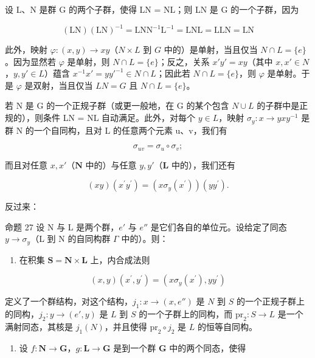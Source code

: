 设 L、N 是群 G 的两个子群，使得 LN = NL；则 LN 是 G 的一个子群，因为

\[
(\mathrm{LN}) (\mathrm{LN}) ^ {- 1} = \mathrm{LNN} ^ {- 1} \mathrm{L} ^ {- 1} = \mathrm{LNL} = \mathrm{LLN} = \mathrm{LN}
\]

此外，映射 \(\varphi: (x, y) \to xy\)（\(N \times L\) 到 \(G\) 中的）是单射，当且仅当 \(N \cap L = \{e\}\)。因为显然若 \(\varphi\) 是单射，则 \(N \cap L = \{e\}\)；反之，关系 \(x' y' = xy\)（其中 \(x, x' \in N\)，\(y, y' \in L\)）蕴含 \(x^{-1}x' = yy'^{-1} \in N \cap L\)；因此若 \(N \cap L = \{e\}\)，则 \(\varphi\) 是单射。于是 \(\varphi\) 是双射，当且仅当 \(LN = G\) 且 \(N \cap L = \{e\}\)。

若 N 是 G 的一个正规子群（或更一般地，在 G 的某个包含 \(N \cup L\) 的子群中是正规的），则条件 LN = NL 自动满足。此外，对每个 \(y \in L\)，映射 \(\sigma_{y}: x \to yxy^{-1}\) 是群 N 的一个自同构，且对 L 的任意两个元素 u、v，我们有

\[
\sigma_ {u v} = \sigma_ {u} \circ \sigma_ {v};\tag{1}
\]

而且对任意 \(x, x'\)（\(\mathbf{N}\) 中的）与任意 \(y, y'\)（\(\mathbf{L}\) 中的），我们还有

\[
(x y) (x ^ {\prime} y ^ {\prime}) = (x \sigma_ {y} (x ^ {\prime})) (y y ^ {\prime}).\tag{2}
\]

反过来：

命题 27 设 N 与 L 是两个群，\(e'\) 与 \(e''\) 是它们各自的单位元。设给定了同态 \(y \to \sigma_y\)（L 到 N 的自同构群 \(\Gamma\) 中的）。则：

\begin{enumerate}
\def\labelenumi{\arabic{enumi})}
\tightlist
\item
  在积集 \(\mathbf{S} = \mathbf{N} \times \mathbf{L}\) 上，内合成法则
\end{enumerate}

\[
(x, y) (x ^ {\prime}, y ^ {\prime}) = (x \sigma_ {y} (x ^ {\prime}), y y ^ {\prime})\tag{3}
\]

定义了一个群结构，对这个结构，\(j_1: x \to (x, e'')\) 是 \(N\) 到 \(S\) 的一个正规子群上的同构，\(j_2: y \to (e', y)\) 是 \(L\) 到 \(S\) 的一个子群上的同构，而 \(\mathrm{pr}_2: S \to L\) 是一个满射同态，其核是 \(j_1(N)\)，并且使得 \(\mathrm{pr}_2 \circ j_2\) 是 \(L\) 的恒等自同构。

\begin{enumerate}
\def\labelenumi{\arabic{enumi})}
\setcounter{enumi}{1}
\tightlist
\item
  设 \(f: \mathbf{N} \to \mathbf{G}\)，\(g: \mathbf{L} \to \mathbf{G}\) 是到一个群 \(\mathbf{G}\) 中的两个同态，使得
\end{enumerate}

